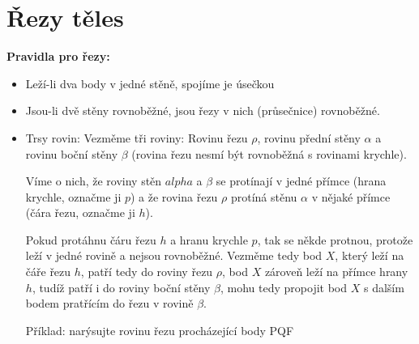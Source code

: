 \documentclass[12pt]{article}
\begin{document}
\section*{Řezy těles}
\textbf{Pravidla pro řezy:}
\begin{itemize} [itemsep = 2pt]
    \item Leží-li dva body v jedné stěně, spojíme je úsečkou
    \item Jsou-li dvě stěny rovnoběžné, jsou řezy v nich (průsečnice) rovnoběžné.
    \item Trsy rovin: Vezměme tři roviny: Rovinu řezu $\rho$, rovinu přední stěny $\alpha$ a rovinu boční stěny $\beta$ (rovina řezu nesmí být rovnoběžná s rovinami krychle).
    
    Víme o nich, že roviny stěn $alpha$ a $\beta$ se protínají v jedné přímce (hrana krychle, označme ji $p$) a že rovina řezu $\rho$ protíná stěnu $\alpha$ v nějaké přímce (čára řezu, označme ji $h$).

    Pokud protáhnu čáru řezu $h$ a hranu krychle $p$, tak se někde protnou, protože leží v jedné rovině a nejsou rovnoběžné. Vezměme tedy bod $X$, který leží na čáře řezu $h$, patří tedy do roviny řezu $\rho$, bod $X$ zároveň leží na přímce hrany $h$, tudíž patří i do roviny boční stěny $\beta$, mohu tedy propojit bod $X$ s dalším bodem pratřícím do řezu v rovině $\beta$.
    
    Příklad: narýsujte rovinu řezu procházející body PQF

\end{itemize}
\end{document}
